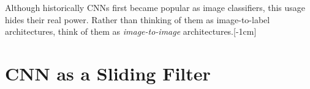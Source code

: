 Although historically CNNs first became popular as image classifiers, this usage hides their real power. Rather than thinking of them as image-to-label architectures, think of them as \textit{image-to-image} architectures.[-1cm] %

\section{CNN as a Sliding Filter}




